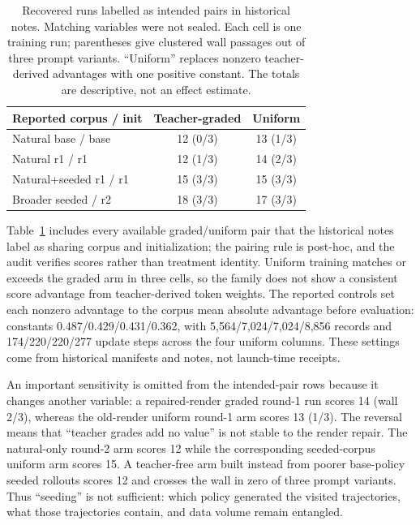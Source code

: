 \documentclass[11pt,a4paper]{article}
\begin{document}
\begin{table}[t]
\caption{Recovered runs labelled as intended pairs in historical notes. Matching
variables were not sealed. Each cell is one training run; parentheses give
clustered wall passages out of three prompt variants.
``Uniform'' replaces nonzero teacher-derived advantages with one positive
constant. The totals are descriptive, not an effect estimate.}
\label{tab:matched-controls}
\centering
\small
\setlength{\tabcolsep}{3pt}
\begin{tabular}{@{}lcc@{}}
\toprule
Reported corpus / init & Teacher-graded & Uniform \\
\midrule
Natural base / base & 12 (0/3) & 13 (1/3) \\
Natural r1 / r1 & 12 (1/3) & 14 (2/3) \\
Natural+seeded r1 / r1 & 15 (3/3) & 15 (3/3) \\
Broader seeded / r2 & 18 (3/3) & 17 (3/3) \\
\bottomrule
\end{tabular}
\end{table}

Table~\ref{tab:matched-controls} includes every available graded/uniform pair
that the historical notes label as sharing corpus and initialization; the
pairing rule is post-hoc, and the audit verifies scores rather than treatment
identity. Uniform training matches or exceeds the graded arm in three cells,
so the family does not show a consistent score advantage from teacher-derived
token weights. The reported controls set each nonzero advantage to the corpus
mean absolute advantage before evaluation: constants
0.487/0.429/0.431/0.362, with 5,564/7,024/7,024/8,856 records and
174/220/220/277 update steps across the four uniform columns. These settings
come from historical manifests and notes, not launch-time receipts.

An important sensitivity is omitted from the intended-pair rows because it
changes another variable: a repaired-render graded round-1 run scores 14
(wall 2/3), whereas the old-render uniform round-1 arm scores 13 (1/3).
The reversal means that ``teacher grades add no value'' is not stable to the
render repair. The natural-only round-2 arm
scores 12 while the corresponding seeded-corpus uniform arm scores 15. A
teacher-free arm built instead from poorer base-policy seeded rollouts scores
12 and crosses the wall in zero of three prompt variants. Thus ``seeding'' is
not sufficient: which policy generated the visited trajectories, what those
trajectories contain, and data volume remain entangled.
\end{document}
